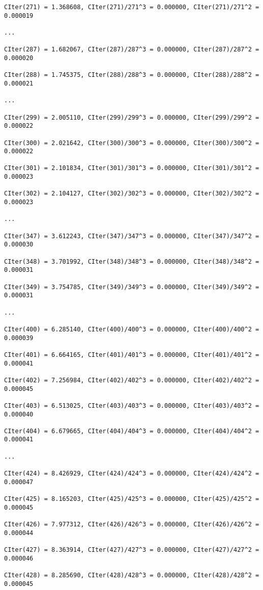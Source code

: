 \documentclass[french]{article}
\begin{document}
\begin{lstlisting}
CIter(271) = 1.368608, CIter(271)/271^3 = 0.000000, CIter(271)/271^2 = 0.000019

...

CIter(287) = 1.682067, CIter(287)/287^3 = 0.000000, CIter(287)/287^2 = 0.000020

CIter(288) = 1.745375, CIter(288)/288^3 = 0.000000, CIter(288)/288^2 = 0.000021

...

CIter(299) = 2.005110, CIter(299)/299^3 = 0.000000, CIter(299)/299^2 = 0.000022

CIter(300) = 2.021642, CIter(300)/300^3 = 0.000000, CIter(300)/300^2 = 0.000022

CIter(301) = 2.101834, CIter(301)/301^3 = 0.000000, CIter(301)/301^2 = 0.000023

CIter(302) = 2.104127, CIter(302)/302^3 = 0.000000, CIter(302)/302^2 = 0.000023

...

CIter(347) = 3.612243, CIter(347)/347^3 = 0.000000, CIter(347)/347^2 = 0.000030

CIter(348) = 3.701992, CIter(348)/348^3 = 0.000000, CIter(348)/348^2 = 0.000031

CIter(349) = 3.754785, CIter(349)/349^3 = 0.000000, CIter(349)/349^2 = 0.000031

...

CIter(400) = 6.285140, CIter(400)/400^3 = 0.000000, CIter(400)/400^2 = 0.000039

CIter(401) = 6.664165, CIter(401)/401^3 = 0.000000, CIter(401)/401^2 = 0.000041

CIter(402) = 7.256984, CIter(402)/402^3 = 0.000000, CIter(402)/402^2 = 0.000045

CIter(403) = 6.513025, CIter(403)/403^3 = 0.000000, CIter(403)/403^2 = 0.000040

CIter(404) = 6.679665, CIter(404)/404^3 = 0.000000, CIter(404)/404^2 = 0.000041

...

CIter(424) = 8.426929, CIter(424)/424^3 = 0.000000, CIter(424)/424^2 = 0.000047

CIter(425) = 8.165203, CIter(425)/425^3 = 0.000000, CIter(425)/425^2 = 0.000045

CIter(426) = 7.977312, CIter(426)/426^3 = 0.000000, CIter(426)/426^2 = 0.000044

CIter(427) = 8.363914, CIter(427)/427^3 = 0.000000, CIter(427)/427^2 = 0.000046

CIter(428) = 8.285690, CIter(428)/428^3 = 0.000000, CIter(428)/428^2 = 0.000045

\end{lstlisting}
\end{document}
